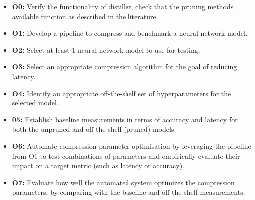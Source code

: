 \documentclass[../Dissertation.tex]{subfiles}
\begin{document}
\begin{itemize}
    \item \textbf{O0:}\label{obj:VerifyComp} Verify the functionality of distiller, check that the pruning methods available function as described in the literature.
    \item \textbf{O1:}\label{obj:BuildPipeline} Develop a pipeline to compress and benchmark a neural network model.
    \item \textbf{O2:}\label{obj:ModelSel} Select at least 1 neural network model to use for testing.
    \item \textbf{O3:}\label{obj:SelCompress} Select an appropriate compression algorithm for the goal of reducing latency.
    \item \textbf{O4:}\label{obj:OTSparams} Identify an appropriate off-the-shelf set of hyperparameters for the selected model.
    \item \textbf{05:}\label{obj:baselines} Establish baseline measurements in terms of accuracy and latency for both the unpruned and off-the-shelf (pruned) models. 
    \item \textbf{O6:}\label{obj:AutoParams} Automate compression parameter optimisation by leveraging the pipeline from O1 to test combinations of parameters and empirically evaluate their impact on a target metric (such as latency or accuracy). 
    \item \textbf{O7:}\label{obj:EvaluateResutls} Evaluate how well the automated system optimizes the compression parameters, by comparing with the baseline and off the shelf measurements.

\end{itemize}
\end{document}
